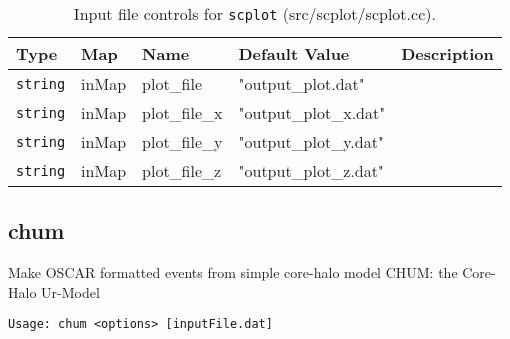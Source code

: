 \documentclass[10pt]{article}
\begin{document}
        \begin{table}
            \begin{tabular}{lllll}
                \hline\hline
                Type & Map & Name & Default Value & Description \\
                \hline\hline 
                {\tt string} & inMap & plot\_file & "output\_plot.dat" & \\\hline
                {\tt string} & inMap & plot\_file\_x & "output\_plot\_x.dat" & \\\hline
                {\tt string} & inMap & plot\_file\_y & "output\_plot\_y.dat" & \\\hline
                {\tt string} & inMap & plot\_file\_z & "output\_plot\_z.dat" & \\\hline
            \end{tabular}
            \caption{Input file controls for {\tt scplot} (src/scplot/scplot.cc). }
        \end{table}






\subsection{chum}
Make OSCAR formatted events from simple core-halo model
CHUM: the Core-Halo Ur-Model


{\tt Usage: chum <options> [inputFile.dat]}
 
\end{document}
